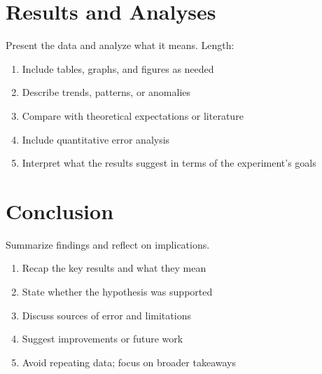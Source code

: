 \documentclass{413L}
\begin{document}
\section{Results and Analyses}
Present the data and analyze what it means. Length: 

\begin{enumerate}
    \item Include tables, graphs, and figures as needed
    \item Describe trends, patterns, or anomalies
    \item Compare with theoretical expectations or literature
    \item Include quantitative error analysis
    \item Interpret what the results suggest in terms of the experiment’s goals
\end{enumerate}

\section{Conclusion}
Summarize findings and reflect on implications. 

\begin{enumerate}
    \item Recap the key results and what they mean
    \item State whether the hypothesis was supported
    \item Discuss sources of error and limitations
    \item Suggest improvements or future work
    \item Avoid repeating data; focus on broader takeaways
\end{enumerate}





    
    
\end{document}

